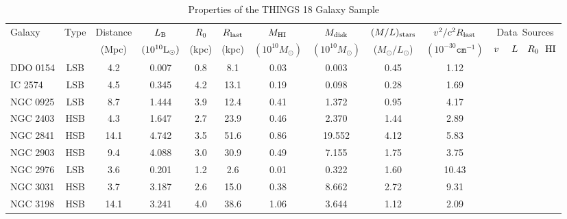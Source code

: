 \documentclass[preprint,aps]{revtex4}
\begin{document}
\begin{table}
\caption{Properties of the THINGS 18 Galaxy Sample}
\centering
\begin{tabular}{l c c c c c c c c c c} 
\hline\hline
 \phantom{00}Galaxy  & \phantom{0}Type \phantom{0}&Distance  & $L_{\rm  B}$ & $R_0$  & $R_{\rm last} $ &  $M_{\rm HI} $ & $M_{\rm disk}$ &  $ 
(M/L) _{\rm stars}$ & $v^2 / c^2 R_{\rm last}$ & Data~Sources \\  
& &  (Mpc)  &  $(10^{10}{\rm L}_{\odot})$&(kpc) & (kpc) & {$(10^{10} M_\odot)$} & {$(10^{10}
M_\odot)$} & ({$M_{\odot}/L_{\odot}$}) & {$(10^{-30}\texttt{cm}^{-1})$} & $v~~~~L~~~R_0~~{\rm HI}$\\
\hline
DDO 0154 &LSB& \phantom{0}4.2 &   0.007   & 0.8 & \phantom{0}8.1 & 0.03  &
\phantom{0}0.003 & 0.45 & \phantom{0}1.12&\cite{deBlok2008} \cite{Walter2008}  \cite{Leroy2008}  \cite{Walter2008}  
\\
\phantom{NI}IC 2574 &LSB & \phantom{0}4.5  &  0.345    &4.2 & 13.1 &0.19 &
\phantom{0}0.098 & 0.28 &\phantom{0}1.69&\cite{deBlok2008} \cite{Walter2008} \cite{Pasquali2008} \cite{Walter2008}   
\\
NGC 0925 &LSB& \phantom{0}8.7 &   1.444   & 3.9 & 12.4 & 0.41 & \phantom{0}1.372 & 0.95
&\phantom{0}4.17&\cite{deBlok2008} \cite{Walter2008} \cite{Leroy2008} \cite{Walter2008}    
 \\
NGC 2403 & HSB &\phantom{0}4.3 &  1.647    & 2.7 & 23.9 & 0.46 & \phantom{0}2.370 &1.44 & \phantom{0}2.89&\cite{deBlok2008} \cite{Walter2008} \cite{Wevers1986} \cite{Walter2008}
\\
NGC 2841 &HSB& 14.1 &  4.742    & 3.5 & 51.6 & 0.86 & 19.552 & 4.12& \phantom{0}5.83&\cite{deBlok2008} \cite{Walter2008} \cite{Begeman1987} \cite{Walter2008}  
\\
NGC 2903 &HSB& \phantom{0}9.4 &  4.088    &  3.0 & 30.9 & 0.49 & \phantom{0}7.155 &
1.75 &\phantom{0}3.75&\cite{deBlok2008} \cite{Walter2008} \cite{Wevers1986} \cite{Walter2008}
\\
NGC 2976 &LSB& \phantom{0}3.6 &  0.201   & 1.2 & \phantom{0}2.6 & 0.01 &
\phantom{0}0.322 &1.60&10.43&\cite{deBlok2008} \cite{Walter2008} \cite{Simon2003} \cite{Walter2008}     
\\
NGC 3031 &HSB& \phantom{0}3.7 &   3.187  & 2.6 & 15.0 & 0.38 & \phantom{0}8.662 & 2.72
&\phantom{0}9.31&\cite{deBlok2008} \cite{Walter2008} \cite{Murphy2008} \cite{Walter2008}
\\
NGC 3198 &HSB& 14.1 &   3.241   & 4.0 & 38.6 & 1.06 & \phantom{0}3.644 &1.12& \phantom{0}2.09&\cite{deBlok2008} \cite{Walter2008} \cite{Wevers1986} \cite{Walter2008}  

\end{tabular}
\end{table}
\end{document}
